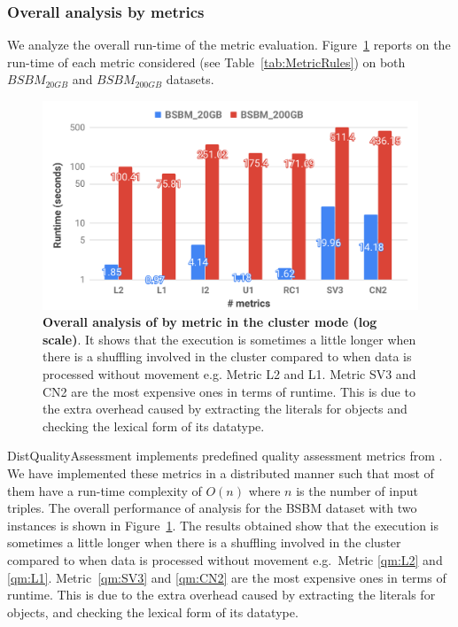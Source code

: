 \subsubsection{Overall analysis by metrics}
We analyze the overall run-time of the metric evaluation.
Figure~\ref{fig:distqualityassessment-overall-analysis} reports on the run-time of each metric considered (see Table~\ref{tab:MetricRules}) on both $BSBM_{20GB}$ and $BSBM_{200GB}$ datasets.

\begin{figure}
\includegraphics[width=1.0\columnwidth]{images/5_distqualityassessment/distqualityassessment-overall-analysis.pdf}
\caption{\textbf{Overall analysis of by metric in the cluster mode (log scale)}.
It shows that the execution is sometimes a little longer when there is a shuffling involved in the cluster compared to when data is processed without movement e.g. Metric L2 and L1. 
Metric SV3 and CN2 are the most expensive ones in terms of runtime. This is due to the extra overhead caused by extracting the literals for objects and checking the lexical form of its datatype.
}
\label{fig:distqualityassessment-overall-analysis}
\end{figure}

DistQualityAssessment implements predefined quality assessment metrics from \cite{zaveri2015quality}. 
We have implemented these metrics in a distributed manner such that most of them have a run-time complexity of $O(n)$ where $n$ is the number of input triples.
The overall performance of analysis for the BSBM dataset with two instances is shown in Figure~\ref{fig:distqualityassessment-overall-analysis}.
The results obtained show that the execution is sometimes a little longer when there is a shuffling involved in the cluster compared to when data is processed without movement e.g.~Metric \ref{qm:L2} and \ref{qm:L1}.
Metric~\ref{qm:SV3} and \ref{qm:CN2} are the most expensive ones in terms of runtime.
This is due to the extra overhead caused by extracting the literals for objects, and checking the lexical form of its datatype. 

